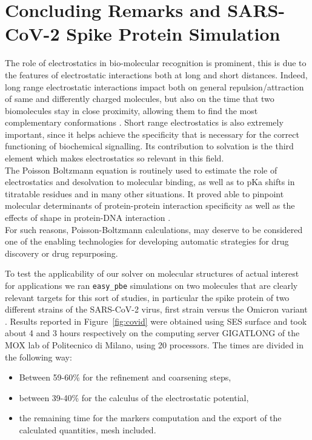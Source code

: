 \documentclass[11pt,a4paper]{article}
\begin{document}
\section{Concluding Remarks and SARS-CoV-2 Spike Protein Simulation}
\label{sec:spike}
The role of electrostatics in bio-molecular recognition is prominent, this is due to the features of electrostatic interactions both at long and short distances. Indeed, long range electrostatic interactions impact both on general repulsion/attraction of same and differently charged molecules, but also on the time that two biomolecules stay in close proximity, allowing them to find the most complementary conformations \cite{roc1}. Short range electrostatics is also extremely important, since it helps achieve the specificity that is necessary for the correct functioning of biochemical signalling. Its contribution to solvation is the third element which makes electrostatics so relevant in this field. \\
The Poisson Boltzmann equation is routinely used to estimate the role of electrostatics and desolvation to molecular binding, as well as to pKa shifts in titratable residues and in many other situations. It proved able to pinpoint molecular determinants of protein-protein interaction specificity \cite{roc2} as well as the effects of shape in protein-DNA interaction
\cite{roc3}. \\
For such reasons, Poisson-Boltzmann calculations, may deserve to be considered  one of the enabling 
technologies for developing automatic strategies for drug discovery or drug repurposing.

To test the applicability of our solver on molecular structures of actual interest for
applications we ran  {\tt easy\_pbe} simulations on
two molecules that are clearly relevant targets for this sort of studies, in particular the spike
protein of two different strains of the SARS-CoV-2 virus, first strain \cite{ 6vyb, 6vyb2} 
versus the Omicron variant \cite{7tb4, 7tb42}. 
Results reported in Figure~\ref{fig:covid} were obtained using SES surface and took about 4 and 3 hours respectively on the computing server GIGATLONG of the MOX lab of Politecnico di Milano, using 20 processors. The times are divided in the following way:
\begin{itemize}
    \item Between 59-60\% for the refinement and coarsening steps,
    \item between 39-40\% for the calculus of the electrostatic potential,
    \item the remaining time for the markers computation and the export of the calculated quantities, mesh included.
\end{itemize}
\end{document}

